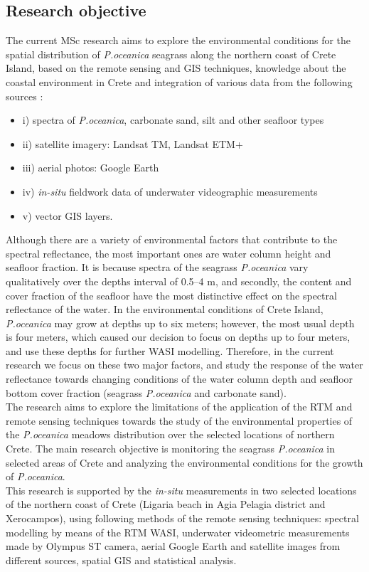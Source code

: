 \documentclass[11pt]{article}
\begin{document}
\subsection{Research objective}
The current MSc research aims to explore the environmental conditions for the spatial distribution of \textit{P.oceanica} seagrass along the northern coast of Crete Island, based on the remote sensing and \ac{GIS} techniques, knowledge about the coastal environment in Crete and integration of various data
from the following sources :
	\begin{itemize}
		\item[] i) spectra of \textit{P.oceanica}, carbonate sand, silt and other seafloor types
		\item[] ii) satellite imagery: \ac{Landsat TM}, \ac{Landsat ETM+}
		\item[] iii) aerial photos: Google Earth
		\item[] iv) \textit{in-situ} fieldwork data of underwater videographic measurements
		\item[] v) vector GIS layers.
	\end{itemize}
Although there are a variety of environmental factors that contribute to the spectral
reflectance, the most important ones are water column height and seafloor fraction.
It is because spectra of the seagrass \textit{P.oceanica} vary qualitatively over the depths interval of 0.5–4 m,
and secondly, the content and cover fraction of the seafloor have the most distinctive effect on the
spectral reflectance of the water. 
In the environmental conditions of Crete Island, \textit{P.oceanica} may grow at depths up to six meters; however, the most usual depth is four meters, 
which caused our decision to focus on depths up to four meters, and use these depths for further WASI modelling. 
Therefore, in the current research we focus on these two major factors, and study the response of the
water reflectance towards changing conditions of the water column depth and seafloor bottom cover
fraction (seagrass \textit{P.oceanica} and carbonate sand).\\
The research aims to explore the limitations of the application of the \ac{RTM} and remote sensing techniques 
towards the study of the environmental properties of the \textit{P.oceanica} meadows distribution
over the selected locations of northern Crete. The main research objective is monitoring the seagrass \textit{P.oceanica} in selected areas of Crete and analyzing the environmental conditions for the growth of \textit{P.oceanica}. \\
This research is supported by the \textit{in-situ} measurements in two selected locations of the northern coast
of Crete (Ligaria beach in Agia Pelagia district and Xerocampos), using following methods of the
remote sensing techniques: spectral modelling by means of the \ac{RTM} \ac{WASI}, underwater videometric measurements made by \ac{Olympus ST} camera, aerial Google Earth and satellite images from different sources, spatial \ac{GIS} and statistical analysis.
\end{document}
